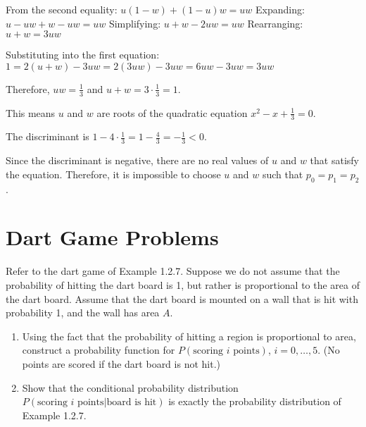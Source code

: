 From the second equality: $u(1-w) + (1-u)w = uw$
Expanding: $u - uw + w - uw = uw$
Simplifying: $u + w - 2uw = uw$
Rearranging: $u + w = 3uw$

Substituting into the first equation: $1 = 2(u + w) - 3uw = 2(3uw) - 3uw = 6uw - 3uw = 3uw$

Therefore, $uw = \frac{1}{3}$ and $u + w = 3 \cdot \frac{1}{3} = 1$.

This means $u$ and $w$ are roots of the quadratic equation $x^2 - x + \frac{1}{3} = 0$.

The discriminant is $1 - 4 \cdot \frac{1}{3} = 1 - \frac{4}{3} = -\frac{1}{3} < 0$.

Since the discriminant is negative, there are no real values of $u$ and $w$ that satisfy the equation. Therefore, it is impossible to choose $u$ and $w$ such that $p_0 = p_1 = p_2$.


\section{Dart Game Problems}

\begin{problembox}
Refer to the dart game of Example 1.2.7. Suppose we do not assume that the probability of hitting the dart board is 1, but rather is proportional to the area of the dart board. Assume that the dart board is mounted on a wall that is hit with probability 1, and the wall has area $A$.
\begin{enumerate}[label=(\alph*)]
    \item Using the fact that the probability of hitting a region is proportional to area, construct a probability function for $P(\text{scoring } i \text{ points})$, $i = 0, \ldots, 5$. (No points are scored if the dart board is not hit.)
    \item Show that the conditional probability distribution $P(\text{scoring } i \text{ points}|\text{board is hit})$ is exactly the probability distribution of Example 1.2.7.
\end{enumerate}
\end{problembox}

